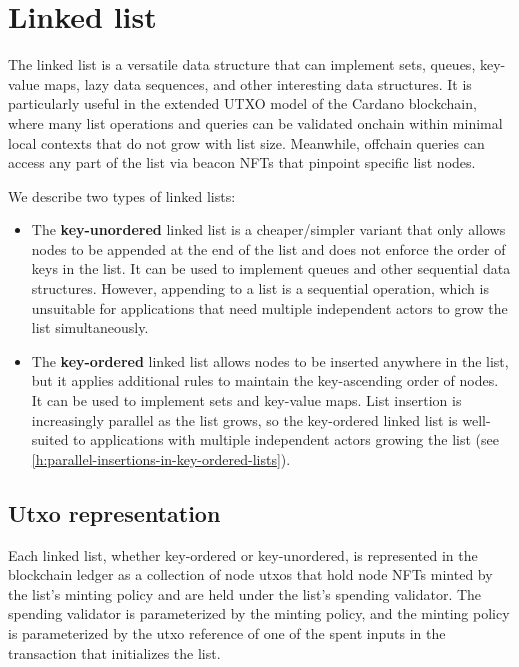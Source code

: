 \documentclass[../midgard.tex]{subfiles}
\begin{document}
\section{Linked list}
\label{h:linked-list}

The linked list is a versatile data structure that can implement sets, queues, key-value maps, lazy data sequences, and other interesting data structures. It is particularly useful in the extended UTXO model of the Cardano blockchain, where many list operations and queries can be validated onchain within minimal local contexts that do not grow with list size. Meanwhile, offchain queries can access any part of the list via beacon NFTs that pinpoint specific list nodes.

We describe two types of linked lists:

\begin{itemize}
    \item The \textbf{key-unordered} linked list is a cheaper/simpler variant that only allows nodes to be appended at the end of the list and does not enforce the order of keys in the list. It can be used to implement queues and other sequential data structures. However, appending to a list is a sequential operation, which is unsuitable for applications that need multiple independent actors to grow the list simultaneously.
    \item The \textbf{key-ordered} linked list allows nodes to be inserted anywhere in the list, but it applies additional rules to maintain the key-ascending order of nodes. It can be used to implement sets and key-value maps. List insertion is increasingly parallel as the list grows, so the key-ordered linked list is well-suited to applications with multiple independent actors growing the list (see \cref{h:parallel-insertions-in-key-ordered-lists}).
\end{itemize}

\subsection{Utxo representation}
\label{h:list-utxo-representation}

Each linked list, whether key-ordered or key-unordered, is represented in the blockchain ledger as a collection of node utxos that hold node NFTs minted by the list's minting policy and are held under the list's spending validator. The spending validator is parameterized by the minting policy, and the minting policy is parameterized by the utxo reference of one of the spent inputs in the transaction that initializes the list.
\end{document}
